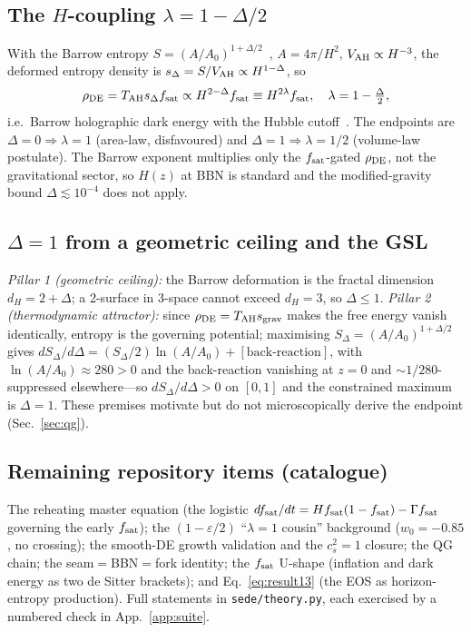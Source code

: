 \subsection{The $H$-coupling $\lambda=1-\Delta/2$}
With the Barrow entropy $S=(A/A_0)^{1+\Delta/2}$~\cite{Barrow:2020kug}, $A=4\pi/H^2$, $V_{\mathrm{AH}}\propto
H^{-3}$, the deformed entropy density is $s_\Delta=S/V_{\mathrm{AH}}\propto H^{1-\Delta}$, so
\begin{equation}
\rho_{\mathrm{DE}}=T_{\mathrm{AH}} s_\Delta f_{\mathrm{sat}}\propto H^{2-\Delta}f_{\mathrm{sat}}\equiv H^{2\lambda}f_{\mathrm{sat}},\quad\lambda=1-\tfrac{\Delta}{2},
\end{equation}
i.e.\ Barrow holographic dark energy with the Hubble cutoff~\cite{Saridakis:2020zol}. The endpoints are
$\Delta=0\Rightarrow\lambda=1$ (area-law, disfavoured) and $\Delta=1\Rightarrow\lambda=1/2$ (volume-law
postulate). The Barrow exponent multiplies only the $f_{\mathrm{sat}}$-gated $\rho_{\mathrm{DE}}$, not the gravitational
sector, so $H(z)$ at BBN is standard and the modified-gravity bound $\Delta\lesssim10^{-4}$ does not
apply.

\subsection{$\Delta=1$ from a geometric ceiling and the GSL}
\emph{Pillar 1 (geometric ceiling):} the Barrow deformation is the fractal dimension $d_H=2+\Delta$; a
2-surface in 3-space cannot exceed $d_H=3$, so $\Delta\le1$. \emph{Pillar 2 (thermodynamic attractor):}
since $\rho_{\mathrm{DE}}=T_{\mathrm{AH}}s_{\mathrm{grav}}$ makes the free energy vanish identically, entropy is the governing potential;
maximising $S_\Delta=(A/A_0)^{1+\Delta/2}$ gives $dS_\Delta/d\Delta=(S_\Delta/2)\ln(A/A_0)+[\text{back-reaction}]$,
with $\ln(A/A_0)\approx280>0$ and the back-reaction vanishing at $z=0$ and $\sim1/280$-suppressed
elsewhere---so $dS_\Delta/d\Delta>0$ on $[0,1]$ and the constrained maximum is $\Delta=1$. These
premises motivate but do not microscopically derive the endpoint (Sec.~\ref{sec:qg}).

\subsection{Remaining repository items (catalogue)}
The reheating master equation (the logistic $df_{\rm sat}/dt=Hf_{\rm sat}(1-f_{\rm sat})-\Gamma f_{\rm
sat}$ governing the early $f_{\mathrm{sat}}$); the $(1-\varepsilon/2)$ ``$\lambda=1$ cousin'' background
($w_0=-0.85$, no crossing); the smooth-DE growth validation and the $c_s^2=1$ closure; the QG chain; the
seam$=$BBN$=$fork identity; the $f_{\mathrm{sat}}$ U-shape (inflation and dark energy as two de Sitter brackets);
and Eq.~\eqref{eq:result13} (the EOS as horizon-entropy production). Full statements in
\texttt{sede/theory.py}, each exercised by a numbered check in App.~\ref{app:suite}.

